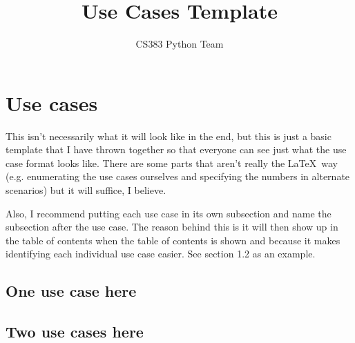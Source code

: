 \documentclass[12pt,letterpaper]{scrreprt}
\title{Use Cases Template}
\author{CS383 Python Team}
\date{}
\begin{document}
\maketitle
\chapter{Use cases}
This isn't necessarily what it will look like in the end, but this is just a basic template that I have thrown together so that everyone can see just what the use case format looks like.  There are some parts that aren't really the \LaTeX\ way (e.g. enumerating the use cases ourselves and specifying the numbers in alternate scenarios) but it will suffice, I believe.

Also, I recommend putting each use case in its own subsection and name the subsection after the use case.  The reason behind this is it will then show up in the table of contents when the table of contents is shown and because it makes identifying each individual use case easier.  See section 1.2 as an example.
\section{One use case here}
	\begin{usecase}
	\end{usecase}
\section{Two use cases here}
\end{document}
